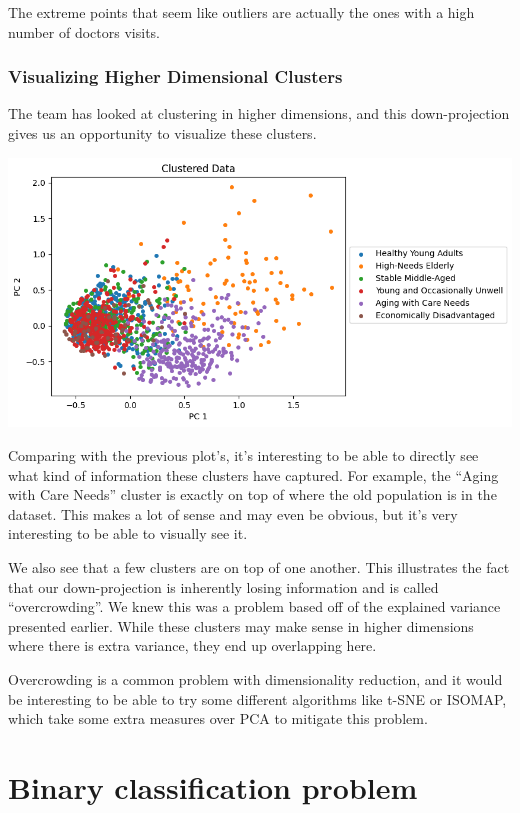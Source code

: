 \documentclass[
]{article}
\begin{document}
The extreme points that seem like outliers are actually the ones with a
high number of doctors visits.

\subsubsection{Visualizing Higher Dimensional
Clusters}\label{visualizing-higher-dimensional-clusters}

The team has looked at clustering in higher dimensions, and this
down-projection gives us an opportunity to visualize these clusters.

\includegraphics{mca_clustering_vis.png}

Comparing with the previous plot's, it's interesting to be able to
directly see what kind of information these clusters have captured. For
example, the ``Aging with Care Needs'' cluster is exactly on top of
where the old population is in the dataset. This makes a lot of sense
and may even be obvious, but it's very interesting to be able to
visually see it.

We also see that a few clusters are on top of one another. This
illustrates the fact that our down-projection is inherently losing
information and is called ``overcrowding''. We knew this was a problem
based off of the explained variance presented earlier. While these
clusters may make sense in higher dimensions where there is extra
variance, they end up overlapping here.

Overcrowding is a common problem with dimensionality reduction, and it
would be interesting to be able to try some different algorithms like
t-SNE or ISOMAP, which take some extra measures over PCA to mitigate
this problem.

\section{Binary classification
problem}\label{binary-classification-problem}
\end{document}

